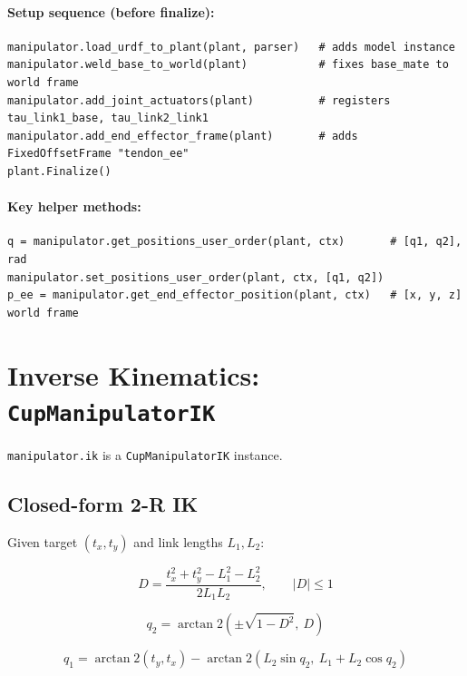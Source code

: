 \documentclass[11pt, a4paper]{article}
\begin{document}
\paragraph{Setup sequence (before finalize):}
\begin{lstlisting}
manipulator.load_urdf_to_plant(plant, parser)   # adds model instance
manipulator.weld_base_to_world(plant)           # fixes base_mate to world frame
manipulator.add_joint_actuators(plant)          # registers tau_link1_base, tau_link2_link1
manipulator.add_end_effector_frame(plant)       # adds FixedOffsetFrame "tendon_ee"
plant.Finalize()
\end{lstlisting}

\paragraph{Key helper methods:}
\begin{lstlisting}
q = manipulator.get_positions_user_order(plant, ctx)       # [q1, q2], rad
manipulator.set_positions_user_order(plant, ctx, [q1, q2])
p_ee = manipulator.get_end_effector_position(plant, ctx)   # [x, y, z] world frame
\end{lstlisting}

\section{Inverse Kinematics: \texttt{CupManipulatorIK}}

\texttt{manipulator.ik} is a \texttt{CupManipulatorIK} instance.

\subsection{Closed-form 2-R IK}

Given target $(t_x, t_y)$ and link lengths $L_1, L_2$:

\begin{equation}
  D = \frac{t_x^2 + t_y^2 - L_1^2 - L_2^2}{2 L_1 L_2}, \qquad |D| \le 1
\end{equation}

\begin{equation}
  q_2 = \arctan2\!\left(\pm\sqrt{1-D^2},\ D\right)
\end{equation}

\begin{equation}
  q_1 = \arctan2(t_y, t_x) - \arctan2(L_2 \sin q_2,\ L_1 + L_2 \cos q_2)
\end{equation}
\end{document}
